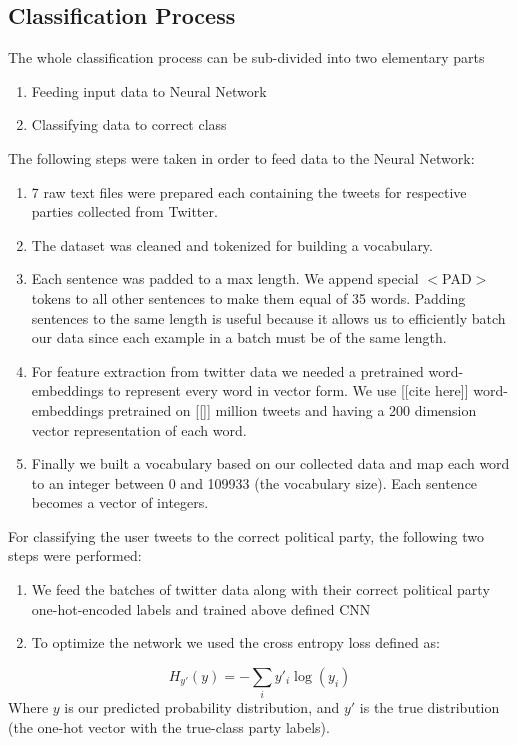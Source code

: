 \documentclass[10pt, oneside]{article}
\begin{document}
\begin{multicols}{2}
\subsection{Classification Process}

The whole classification process can be sub-divided into two elementary parts
\begin{enumerate}
\item Feeding input data to Neural Network
\item Classifying data to correct class
\end{enumerate}
The following steps were taken in order to feed data to the Neural Network:
\begin{enumerate}
\item 7 raw text files were prepared each containing the tweets for respective parties collected from Twitter.
\item The dataset was cleaned and tokenized for building a vocabulary.
\item Each sentence was padded to a max length. We append special $<$PAD$>$ tokens to all other sentences to make them equal of 35 words. Padding sentences to the same length is useful because it allows us to efficiently batch our data since each example in a batch must be of the same length.
\item For feature extraction from twitter data we needed a pretrained word-embeddings to represent every word in vector form. We use [[cite here]] word-embeddings pretrained on [[]] million tweets and having a 200 dimension vector representation of each word.  
\item Finally we built a vocabulary based on our collected data and map each word to an integer between 0 and 109933 (the vocabulary size). Each sentence becomes a vector of integers.
\end{enumerate}

For classifying the user tweets to the correct political party, the following two steps were performed:
\begin{enumerate}
	\item We feed the batches of twitter data along with their correct political party one-hot-encoded labels and trained above defined CNN 
	\item To optimize the network we used the cross entropy loss defined as:
\end{enumerate}
\begin{equation}
	H_{y'}(y) = - \sum_{i} y'_{i} \log (y_{i})
\end{equation}
Where $y$ is our predicted probability distribution, and $y'$ is the true distribution (the one-hot vector with the true-class party labels). 



\end{multicols}
\end{document}
